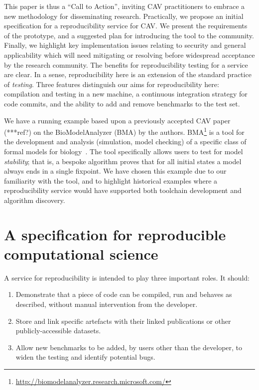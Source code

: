 \documentclass{llncs}
\begin{document}
This paper is thus a ``Call to Action'', inviting CAV practitioners to
embrace a new methodology for disseminating research. Practically, we
propose an initial specification for a reproducibility service for CAV. We
present the requirements of the prototype, and a suggested plan for
introducing the tool to the community. Finally, we highlight key
implementation issues relating to security and general applicability
which will need mitigating or resolving before widespread acceptance
by the research community.  The benefits for reproducibility testing
for a service are clear. In a sense, reproducibility here is an
extension of the standard practice of \emph{testing}.  Three features
distinguish our aims for reproducibility here: compilation and testing
in a new machine, a continuous integration strategy for code commits,
and the ability to add and remove benchmarks to the test set.

We have a running example based upon a previously accepted CAV paper
(***ref?)  on the BioModelAnalyzer (BMA) by the authors.
BMA\footnote{\url{http://biomodelanalyzer.research.microsoft.com/}} is
a tool for the development and analysis (simulation, model checking)
of a specific class of formal models for
biology~\cite{benque2012,cook-et-al:2010,cook2014}. The tool
specifically allows users to test for model \emph{stability}; that is,
a bespoke algorithm proves that for all initial states a model always
ends in a single fixpoint. We have chosen this example due to our
familiarity with the tool, and to highlight historical examples where
a reproducibility service would have supported both toolchain
development and algorithm discovery.



\section{A specification for reproducible computational science}\label{spec}

A service for reproducibility is intended to play three important
roles. It should:

\begin{enumerate}
	\item Demonstrate that a piece of code can be compiled, run and behaves as described,
		without manual intervention from the developer.
	\item Store and link specific artefacts with their linked publications
		or other publicly-accessible datasets.
	\item Allow new benchmarks to be added, by users other than the developer, to 
		widen the testing and identify potential bugs.
\end{enumerate}
\end{document}
